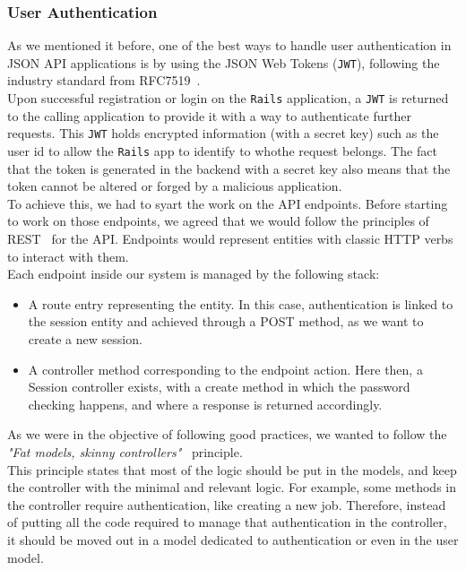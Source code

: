 \documentclass{eplmastersthesis}
\begin{document}
        \subsubsection{User Authentication}

          As we mentioned it before, one of the best ways to handle user
          authentication in JSON API applications is by using the JSON Web
          Tokens (\texttt{JWT}), following the industry standard from RFC7519~\cite{rfc7519}.\\

          Upon successful registration or login on the \texttt{Rails} application, a
          \texttt{JWT} is returned to the calling application to provide it with a way
          to authenticate further requests. This \texttt{JWT} holds encrypted
          information (with a secret key) such as the user id to allow the \texttt{Rails}
          app to identify to whothe request belongs. The fact that the token
          is generated in the backend with a secret key also means that the
          token cannot be altered or forged by a malicious application.\\

          To achieve this, we had to syart the work on the API endpoints.
          Before starting to work on those endpoints, we agreed that we would
          follow the principles of REST~\cite{rest} for the API. Endpoints would
          represent entities with classic HTTP verbs to interact with them.\\

          Each endpoint inside our system is managed by the following stack:

          \begin{itemize}
            \item A route entry representing the entity. In this case,
            authentication is linked to the session entity and achieved through
            a POST method, as we want to create a new session.
            \item A controller method corresponding to the endpoint action.
            Here then, a Session controller exists, with a create method in
            which the password checking happens, and where a response is
            returned accordingly.
          \end{itemize}

          As we were in the objective of following good practices, we wanted
          to follow the \textit{"Fat models, skinny controllers"}~\cite{fatski}
          principle.\\
          This principle states that most of the logic should be put in the
          models, and keep the controller with the minimal and relevant logic.
          For example, some methods in the controller require authentication,
          like creating a new job. Therefore, instead of putting all the code
          required to manage that authentication in the controller, it should
          be moved out in a model dedicated to authentication or even in
          the user model.\\
\end{document}
